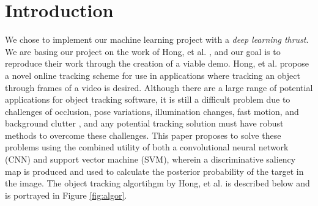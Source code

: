 \documentclass{sig-alternate-05-2015}
\begin{document}
\section{Introduction}
We chose to implement our machine learning project with a \textit{deep learning thrust}.
We are basing our project on the work of Hong, et al. \cite{hong2015online}, and our goal is to reproduce their work through the creation of a viable demo.
Hong, et al. propose a novel online tracking scheme for use in applications where tracking an object through frames of a video is desired.
Although there are a large range of potential applications for object tracking software, it is still a difficult problem due to challenges of occlusion, pose variations, illumination changes, fast motion, and background clutter \cite{hong2015online}, and any potential tracking solution must have robust methods to overcome these challenges.
This paper proposes to solve these problems using the combined utility of both a convolutional neural network (CNN) and support vector machine (SVM), wherein a discriminative saliency map is produced and used to calculate the posterior probability of the target in the image.
The object tracking algortihgm by Hong, et al. is described below and is portrayed in Figure \ref{fig:algor}.
\end{document}
